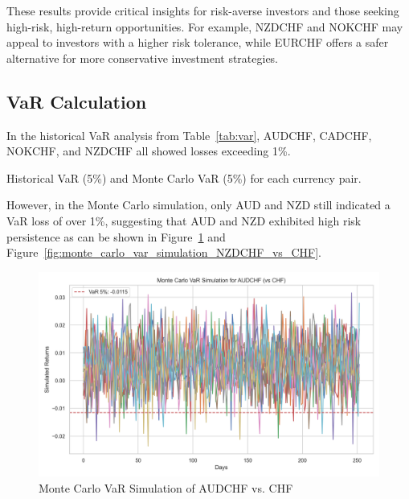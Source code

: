 \documentclass{article}
\begin{document}
These results provide critical insights for risk-averse investors and those seeking high-risk, high-return opportunities. For example, NZDCHF and NOKCHF may appeal to investors with a higher risk tolerance, while EURCHF offers a safer alternative for more conservative investment strategies.

\subsection{VaR Calculation}
In the historical VaR analysis from Table~\ref{tab:var}, AUDCHF, CADCHF, NOKCHF, and NZDCHF all showed losses exceeding 1\%. 

\begin{table}[H]
\centering
\caption{Historical VaR (5\%) and Monte Carlo VaR (5\%) for each currency pair.} 
\label{tab:var}
\end{table}

However, in the Monte Carlo simulation, only AUD and NZD still indicated a VaR loss of over 1\%, suggesting that AUD and NZD exhibited high risk persistence as can be shown in Figure~\ref{fig:monte_carlo_var_simulation_AUDCHF_vs_CHF} and Figure~\ref{fig:monte_carlo_var_simulation_NZDCHF_vs_CHF}.

\begin{figure}[H]
    \centering   
    \includegraphics[width=0.75\linewidth]{../../reports/figures/monte_carlo_var_simulation_AUDCHF_vs_CHF.png}
    \caption{Monte Carlo VaR Simulation of AUDCHF vs. CHF}  \label{fig:monte_carlo_var_simulation_AUDCHF_vs_CHF}
\end{figure}
\end{document}
